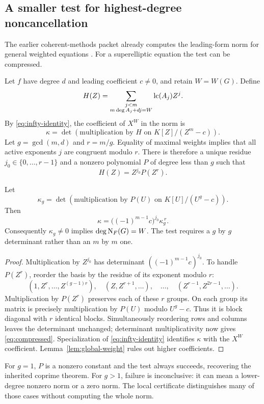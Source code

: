 \subsection{A smaller test for highest-degree noncancellation}
\label{sec:compressed-leading}

The earlier coherent-methods packet already computes the leading-form norm for general weighted equations \cite{repo-coherent}. For a superelliptic equation the test can be compressed.

Let $f$ have degree $d$ and leading coefficient $c\ne0$, and retain $W=W(G)$. Define
\[
 H(Z)=\sum_{\substack{j<m\\m\deg A_j+dj=W}}
          \operatorname{lc}(A_j)Z^j.
\]
By \eqref{eq:infty-identity}, the coefficient of $X^W$ in the norm is
\[
 \kappa=\det(\text{multiplication by }H
                   \text{ on }K[Z]/(Z^m-c)).
\]
Let $g=\gcd(m,d)$ and $r=m/g$. Equality of maximal weights implies that all active exponents $j$ are congruent modulo $r$. There is therefore a unique residue $j_0\in\{0,\ldots,r-1\}$ and a nonzero polynomial $P$ of degree less than $g$ such that
\[
 H(Z)=Z^{j_0}P(Z^r).
\]

\begin{theorem}\label{thm:compressed}
Let
\[
 \kappa_g=\det(\text{multiplication by }P(U)
                     \text{ on }K[U]/(U^g-c)).
\]
Then
\begin{equation}\label{eq:compressed}
 \kappa=\bigl((-1)^{m-1}c\bigr)^{j_0}\kappa_g^{\,r}.
\end{equation}
Consequently $\kappa_g\ne0$ implies $\deg\operatorname{N}_F(G)=W$. The test requires a $g$ by $g$ determinant rather than an $m$ by $m$ one.
\end{theorem}
\begin{proof}
Multiplication by $Z^{j_0}$ has determinant $((-1)^{m-1}c)^{j_0}$. To handle $P(Z^r)$, reorder the basis by the residue of its exponent modulo $r$:
\[
 (1,Z^r,\ldots,Z^{(g-1)r}),\quad
 (Z,Z^{r+1},\ldots),\quad\ldots,\quad
 (Z^{r-1},Z^{2r-1},\ldots).
\]
Multiplication by $P(Z^r)$ preserves each of these $r$ groups. On each group its matrix is precisely multiplication by $P(U)$ modulo $U^g-c$. Thus it is block diagonal with $r$ identical blocks. Simultaneously reordering rows and columns leaves the determinant unchanged; determinant multiplicativity now gives \eqref{eq:compressed}. Specialization of \eqref{eq:infty-identity} identifies $\kappa$ with the $X^W$ coefficient. Lemma~\ref{lem:global-weight} rules out higher coefficients.
\end{proof}

For $g=1$, $P$ is a nonzero constant and the test always succeeds, recovering the inherited coprime theorem. For $g>1$, failure is inconclusive: it can mean a lower-degree nonzero norm or a zero norm. The local certificate distinguishes many of those cases without computing the whole norm.
